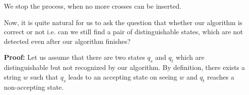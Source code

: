 \documentclass[english, 11pt]{article}
\begin{document}
\begin{center}
\end{center}



We stop the process, when no more crosses can be inserted.


Now, it is quite natural for us to ask the question that whether our algorithm is correct or not i.e. can we still find a pair of distinguishable states, which are not detected even after our algorithm finishes?


\textbf{Proof: }Let us assume that there are two states $q_s$ and $q_t$ which are distinguishable but not recognized by our algorithm. By definition, there exists a string $w$ such that $q_s$ leads to an accepting state on seeing $w$ and $q_t$ reaches a non-accepting state.
\end{document}
